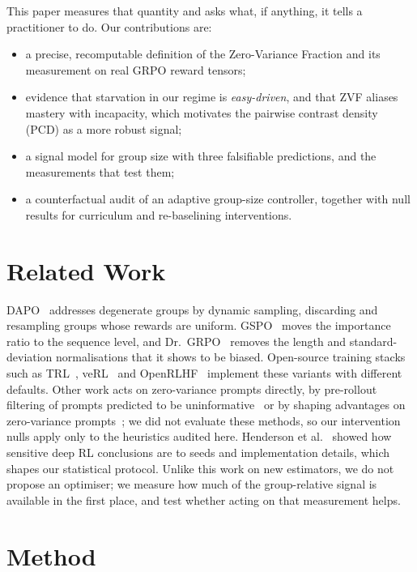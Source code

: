 This paper measures that quantity and asks what, if anything, it tells a
practitioner to do. Our contributions are:
\begin{itemize}
\item a precise, recomputable definition of the Zero-Variance Fraction and
its measurement on real GRPO reward tensors;
\item evidence that starvation in our regime is \emph{easy-driven}, and that
ZVF aliases mastery with incapacity, which motivates the pairwise contrast
density (PCD) as a more robust signal;
\item a signal model for group size with three falsifiable predictions, and
the measurements that test them;
\item a counterfactual audit of an adaptive group-size controller, together
with null results for curriculum and re-baselining interventions.
\end{itemize}

\section{Related Work}

DAPO~\cite{yu2025dapo} addresses degenerate groups by dynamic sampling,
discarding and resampling groups whose rewards are uniform.
GSPO~\cite{qwen2025gspo} moves the importance ratio to the sequence level,
and Dr.\ GRPO~\cite{liu2025understanding} removes the length and
standard-deviation normalisations that it shows to be biased. Open-source
training stacks such as TRL~\cite{vonwerra2022trl}, veRL~\cite{sheng2024verl}
and OpenRLHF~\cite{hu2024openrlhf} implement these variants with different
defaults. Other work acts on zero-variance prompts directly, by pre-rollout
filtering of prompts predicted to be uninformative~\cite{zheng2025greso} or by
shaping advantages on zero-variance prompts~\cite{le2025rlzvp}; we did not
evaluate these methods, so our intervention nulls apply only to the heuristics
audited here. Henderson et al.~\cite{henderson2018deep} showed how sensitive deep
RL conclusions are to seeds and implementation details, which shapes our
statistical protocol. Unlike this work on new estimators, we do not propose
an optimiser; we measure how much of the group-relative signal is available
in the first place, and test whether acting on that measurement helps.

\section{Method}

